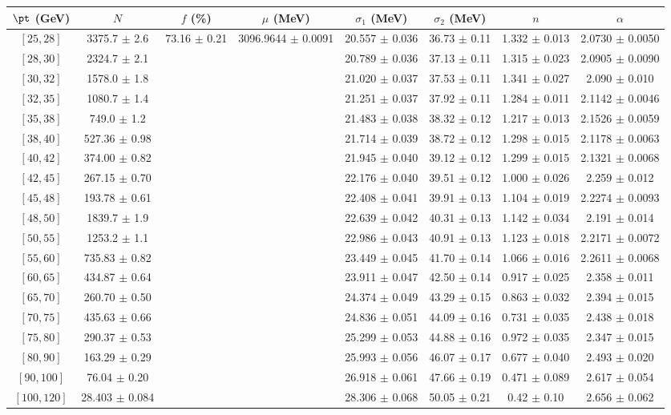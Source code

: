 \begin{tabular}{c||c|c|c|c|c|c|c}
$\pt$ (GeV) & $N$ & $f$ (\%) & $\mu$ (MeV) & $\sigma_1$ (MeV) & $\sigma_2$ (MeV) & $n$ & $\alpha$ \\
\hline
$[25, 28]$ & 3375.7 $\pm$ 2.6 & \multirow{19}{*}{73.16 $\pm$ 0.21} & \multirow{19}{*}{3096.9644 $\pm$ 0.0091} & 20.557 $\pm$ 0.036 & 36.73 $\pm$ 0.11 & 1.332 $\pm$ 0.013 & 2.0730 $\pm$ 0.0050\\
$[28, 30]$ & 2324.7 $\pm$ 2.1 &  &  & 20.789 $\pm$ 0.036 & 37.13 $\pm$ 0.11 & 1.315 $\pm$ 0.023 & 2.0905 $\pm$ 0.0090\\
$[30, 32]$ & 1578.0 $\pm$ 1.8 &  &  & 21.020 $\pm$ 0.037 & 37.53 $\pm$ 0.11 & 1.341 $\pm$ 0.027 & 2.090 $\pm$ 0.010\\
$[32, 35]$ & 1080.7 $\pm$ 1.4 &  &  & 21.251 $\pm$ 0.037 & 37.92 $\pm$ 0.11 & 1.284 $\pm$ 0.011 & 2.1142 $\pm$ 0.0046\\
$[35, 38]$ & 749.0 $\pm$ 1.2 &  &  & 21.483 $\pm$ 0.038 & 38.32 $\pm$ 0.12 & 1.217 $\pm$ 0.013 & 2.1526 $\pm$ 0.0059\\
$[38, 40]$ & 527.36 $\pm$ 0.98 &  &  & 21.714 $\pm$ 0.039 & 38.72 $\pm$ 0.12 & 1.298 $\pm$ 0.015 & 2.1178 $\pm$ 0.0063\\
$[40, 42]$ & 374.00 $\pm$ 0.82 &  &  & 21.945 $\pm$ 0.040 & 39.12 $\pm$ 0.12 & 1.299 $\pm$ 0.015 & 2.1321 $\pm$ 0.0068\\
$[42, 45]$ & 267.15 $\pm$ 0.70 &  &  & 22.176 $\pm$ 0.040 & 39.51 $\pm$ 0.12 & 1.000 $\pm$ 0.026 & 2.259 $\pm$ 0.012\\
$[45, 48]$ & 193.78 $\pm$ 0.61 &  &  & 22.408 $\pm$ 0.041 & 39.91 $\pm$ 0.13 & 1.104 $\pm$ 0.019 & 2.2274 $\pm$ 0.0093\\
$[48, 50]$ & 1839.7 $\pm$ 1.9 &  &  & 22.639 $\pm$ 0.042 & 40.31 $\pm$ 0.13 & 1.142 $\pm$ 0.034 & 2.191 $\pm$ 0.014\\
$[50, 55]$ & 1253.2 $\pm$ 1.1 &  &  & 22.986 $\pm$ 0.043 & 40.91 $\pm$ 0.13 & 1.123 $\pm$ 0.018 & 2.2171 $\pm$ 0.0072\\
$[55, 60]$ & 735.83 $\pm$ 0.82 &  &  & 23.449 $\pm$ 0.045 & 41.70 $\pm$ 0.14 & 1.066 $\pm$ 0.016 & 2.2611 $\pm$ 0.0068\\
$[60, 65]$ & 434.87 $\pm$ 0.64 &  &  & 23.911 $\pm$ 0.047 & 42.50 $\pm$ 0.14 & 0.917 $\pm$ 0.025 & 2.358 $\pm$ 0.011\\
$[65, 70]$ & 260.70 $\pm$ 0.50 &  &  & 24.374 $\pm$ 0.049 & 43.29 $\pm$ 0.15 & 0.863 $\pm$ 0.032 & 2.394 $\pm$ 0.015\\
$[70, 75]$ & 435.63 $\pm$ 0.66 &  &  & 24.836 $\pm$ 0.051 & 44.09 $\pm$ 0.16 & 0.731 $\pm$ 0.035 & 2.438 $\pm$ 0.018\\
$[75, 80]$ & 290.37 $\pm$ 0.53 &  &  & 25.299 $\pm$ 0.053 & 44.88 $\pm$ 0.16 & 0.972 $\pm$ 0.035 & 2.347 $\pm$ 0.015\\
$[80, 90]$ & 163.29 $\pm$ 0.29 &  &  & 25.993 $\pm$ 0.056 & 46.07 $\pm$ 0.17 & 0.677 $\pm$ 0.040 & 2.493 $\pm$ 0.020\\
$[90, 100]$ & 76.04 $\pm$ 0.20 &  &  & 26.918 $\pm$ 0.061 & 47.66 $\pm$ 0.19 & 0.471 $\pm$ 0.089 & 2.617 $\pm$ 0.054\\
$[100, 120]$ & 28.403 $\pm$ 0.084 &  &  & 28.306 $\pm$ 0.068 & 50.05 $\pm$ 0.21 & 0.42 $\pm$ 0.10 & 2.656 $\pm$ 0.062\\
\end{tabular}
